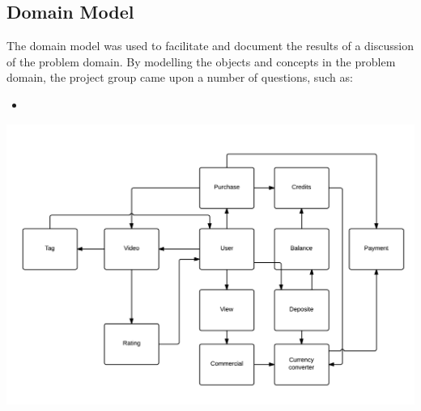 \subsection{Domain Model}
The domain model was used to facilitate and document the results of a discussion of the problem domain. By modelling the objects and concepts in the problem domain, the project group came upon a number of questions, such as:
\begin{itemize}
\item 
\end{itemize}
\begin{center}
\includegraphics[scale=0.15]{DomainModel.png}
\end{center}

